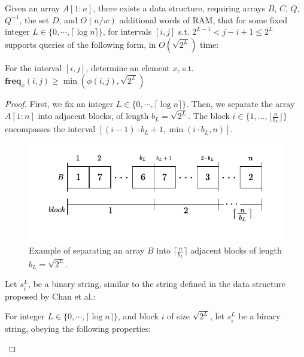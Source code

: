 \documentclass[runningheads]{llncs}
\begin{document}
\begin{lemma}
    Given an array $A[1:n]$, there exists a data structure, requiring arrays $B$, $C$, $Q$, $Q^{-1}$, the set $D$, and $ O(n/w) $ additional words of RAM, that for some fixed integer 
    $L \in \{ 0 , \cdots , \lceil  \log n \rceil \}$, for intervals $[i,j]$ s.t. $ 2^{L-1} < j-i+1 \leq 2^L$
    supports queries of the following form, in $O(\sqrt{2^L})$ time: 

    For the interval $[i,j]$, determine an element $x$, s.t. $\textbf{freq}_x(i,j) \geq \min(\phi(i,j), \sqrt{2^L})$

\end{lemma}
\begin{proof}
    First, we fix an integer $L \in \{ 0 , \cdots , \lceil  \log n \rceil \}$.
    Then, we separate the array $A[1:n]$ into adjacent blocks, of length $b_L = \sqrt{2^L}$. The block $i\in \{1,\dots, \lfloor \frac{n}{b_L} \rfloor\}$ 
    encompasses the interval $[(i-1) \cdot b_L +1, \min(i\cdot b_L , n)]$.

    \begin{figure}[H]
        \centering
        \hspace*{-0.5cm}      
        \includegraphics[scale=0.8]{figures/example_figure1.pdf}
        \caption{ Example of separating an array $B$ into $\lceil \frac{n}{b_{L}} \rceil$ adjacent blocks of length $b_{L}=\sqrt{2^L}$. }
        \label{fig:fig1}
    \end{figure}
    
    Let $s_i^L$, be a binary string, similar to the string defined in the data structure proposed by Chan et al.\cite{chan2014linear}:
    
    \begin{definition}
        For integer $L \in \{ 0 , \cdots , \lceil  \log n \rceil \}$, and block $i$ of size $\sqrt{2^L}$, let $s_i^L$ be a binary string, obeying the following properties:
        

\end{definition}
\end{proof}
\end{document}
